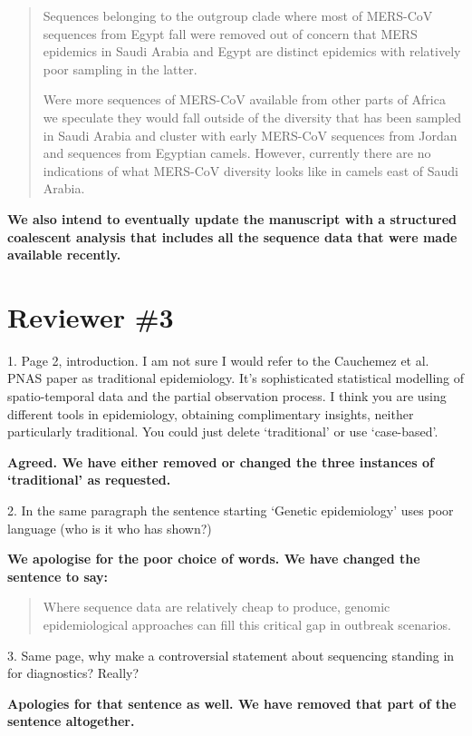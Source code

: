 \documentclass[11pt,oneside,letterpaper]{article}
\begin{document}
\begin{quotation}
Sequences belonging to the outgroup clade where most of MERS-CoV sequences from Egypt fall were removed out of concern that MERS epidemics in Saudi Arabia and Egypt are distinct epidemics with relatively poor sampling in the latter.

Were more sequences of MERS-CoV available from other parts of Africa we speculate they would fall outside of the diversity that has been sampled in Saudi Arabia and cluster with early MERS-CoV sequences from Jordan and sequences from Egyptian camels.
However, currently there are no indications of what MERS-CoV diversity looks like in camels east of Saudi Arabia.
\end{quotation}

\textbf{We also intend to eventually update the manuscript with a structured coalescent analysis that includes all the sequence data that were made available recently.}

\section*{Reviewer \#3}

1. Page 2, introduction. I am not sure I would refer to the Cauchemez et al. PNAS paper as traditional epidemiology. It's sophisticated statistical modelling of spatio-temporal data and the partial observation process. I think you are using different tools in epidemiology, obtaining complimentary insights, neither particularly traditional. You could just delete `traditional' or use `case-based'.

\textbf{Agreed. We have either removed or changed the three instances of `traditional' as requested.}

2. In the same paragraph the sentence starting `Genetic epidemiology' uses poor language (who is it who has shown?)

\textbf{We apologise for the poor choice of words. We have changed the sentence to say:}

\begin{quotation}
Where sequence data are relatively cheap to produce, genomic epidemiological approaches can fill this critical gap in outbreak scenarios.
\end{quotation}

3. Same page, why make a controversial statement about sequencing standing in for diagnostics? Really?

\textbf{Apologies for that sentence as well. We have removed that part of the sentence altogether.}
\end{document}
